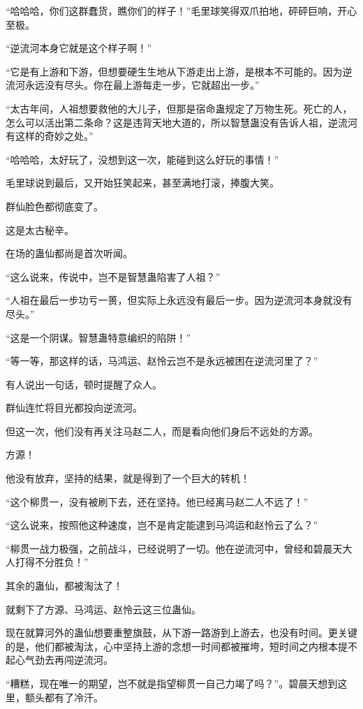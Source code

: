 \begin{this_body}
“哈哈哈，你们这群蠢货，瞧你们的样子！”毛里球笑得双爪拍地，砰砰巨响，开心至极。

“逆流河本身它就是这个样子啊！”

“它是有上游和下游，但想要硬生生地从下游走出上游，是根本不可能的。因为逆流河永远没有尽头。你在最上游每走一步，它就超出一步。”

“太古年间，人祖想要救他的大儿子，但那是宿命蛊规定了万物生死。死亡的人，怎么可以活出第二条命？这是违背天地大道的，所以智慧蛊没有告诉人祖，逆流河有这样的奇妙之处。”

“哈哈哈，太好玩了，没想到这一次，能碰到这么好玩的事情！”

毛里球说到最后，又开始狂笑起来，甚至满地打滚，捧腹大笑。

群仙脸色都彻底变了。

这是太古秘辛。

在场的蛊仙都尚是首次听闻。

“这么说来，传说中，岂不是智慧蛊陷害了人祖？”

“人祖在最后一步功亏一篑，但实际上永远没有最后一步。因为逆流河本身就没有尽头。”

“这是一个阴谋。智慧蛊特意编织的陷阱！”

“等一等，那这样的话，马鸿运、赵怜云岂不是永远被困在逆流河里了？”

有人说出一句话，顿时提醒了众人。

群仙连忙将目光都投向逆流河。

但这一次，他们没有再关注马赵二人，而是看向他们身后不远处的方源。

方源！

他没有放弃，坚持的结果，就是得到了一个巨大的转机！

“这个柳贯一，没有被刷下去，还在坚持。他已经离马赵二人不远了！”

“这么说来，按照他这种速度，岂不是肯定能逮到马鸿运和赵怜云了么？”

“柳贯一战力极强，之前战斗，已经说明了一切。他在逆流河中，曾经和碧晨天大人打得不分胜负！”

其余的蛊仙，都被淘汰了！

就剩下了方源、马鸿运、赵怜云这三位蛊仙。

现在就算河外的蛊仙想要重整旗鼓，从下游一路游到上游去，也没有时间。更关键的是，他们都被淘汰，心中坚持上游的念想一时间都被摧垮，短时间之内根本提不起心气劲去再闯逆流河。

“糟糕，现在唯一的期望，岂不就是指望柳贯一自己力竭了吗？”。碧晨天想到这里，额头都有了冷汗。


\end{this_body}
